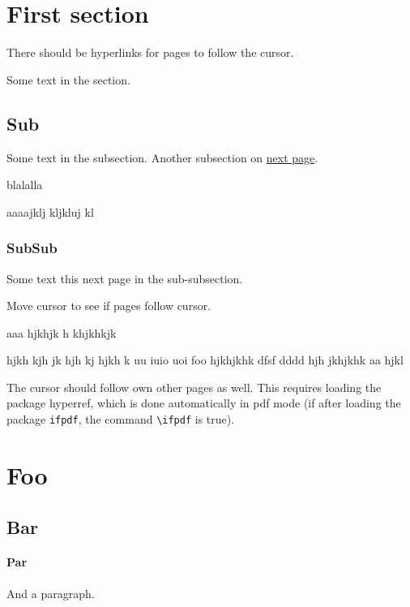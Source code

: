 \documentclass{article}
\begin{document}
\section{First section}

There should be hyperlinks for pages to follow the cursor.  

\tableofcontents



Some text in the section.  
 
\subsection {Sub}

Some text in the subsection. 
Another subsection on \hyperlink{next}{next page}.


blalalla  
\newpage

aaaajklj kljkluj kl
\subsubsection {SubSub} 

Some text this \hypertarget{next}{next page} in the sub-subsection.


Move cursor to see if pages follow cursor.

\newpage

aaa hjkhjk h
\newpage
khjkhkjk

hjkh kjh jk  hjh kj hjkh k uu iuio uoi foo
hjkhjkhk  dfsf dddd hjh jkhjkhk aa hjkl
\medskip




The cursor should follow own other pages as well.
This requires loading the package hyperref, which is done
automatically in pdf mode (if after loading the package \texttt{ifpdf}, 
the command \verb"\ifpdf" is true). 


\section{Foo}

\subsection {Bar}


\paragraph {Par}

And a paragraph.
\end{document}
